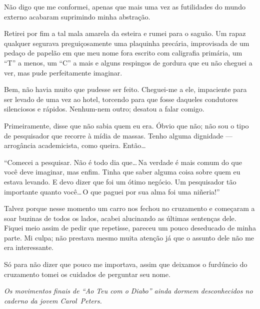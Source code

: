 Não digo que me conformei, apenas que mais uma vez as futilidades do mundo externo acabaram suprimindo minha abstração.

Retirei por fim a tal mala amarela da esteira e rumei para o saguão. Um rapaz qualquer segurava preguiçosamente uma plaquinha precária, improvisada de um pedaço de papelão em que meu nome fora escrito com caligrafia primária, um ``T'' a menos, um ``C'' a mais e alguns respingos de gordura que eu não cheguei a ver, mas pude perfeitamente imaginar.

Bem, não havia muito que pudesse ser feito. Cheguei-me a ele, impaciente para ser levado de uma vez ao hotel, torcendo para que fosse daqueles condutores silenciosos e rápidos. Nenhum-nem outro; desatou a falar comigo.

Primeiramente, disse que não sabia quem eu era. Óbvio que não; não sou o tipo de pesquisador que recorre à mídia de massas. Tenho alguma dignidade --- arrogância academicista, como queira. Então\ldots

``Comecei a pesquisar. Não é todo dia que\ldots\,Na verdade é mais comum do que você deve imaginar, mas enfim. Tinha que saber alguma coisa sobre quem eu estava levando. E devo dizer que foi um ótimo negócio. Um pesquisador tão importante quanto você\ldots\,O que paguei por sua alma foi uma niñeria!''

Talvez porque nesse momento um carro nos fechou no cruzamento e começaram a soar buzinas de todos os lados, acabei alucinando as últimas sentenças dele. Fiquei meio assim de pedir que repetisse, pareceu um pouco deseducado de minha parte. Mi culpa; não prestava mesmo muita atenção já que o assunto dele não me era interessante.

Só para não dizer que pouco me importava, assim que deixamos o furdúncio do cruzamento tomei os cuidados de perguntar seu nome.

	\begin{center}
	\emph{Os movimentos finais de ``Ao Teu com o Diabo'' ainda dormem desconhecidos no caderno da jovem Carol~Peters.}
	\end{center}
